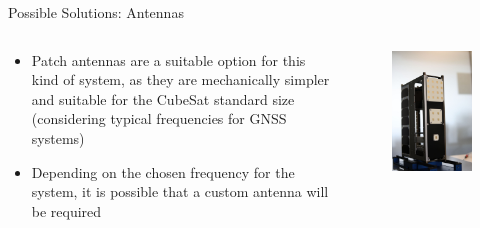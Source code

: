\begin{frame}{Possible Solutions: Antennas}

    \begin{columns}[t]
        \begin{column}[t]{0.7\textwidth}
            \begin{itemize}
                \item Patch antennas are a suitable option for this kind of system, as they are mechanically simpler and suitable for the CubeSat standard size (considering typical frequencies for GNSS systems)
                \vspace{0.2cm}
                \item Depending on the chosen frequency for the system, it is possible that a custom antenna will be required
            \end{itemize}
        \end{column}
        \begin{column}[t]{0.3\textwidth}
            \begin{figure}[!ht]
                \begin{center}
                    \includegraphics[width=\columnwidth]{figures/x-band-patch-array}
                \end{center}
            \end{figure}
        \end{column}
    \end{columns}


\end{frame}
